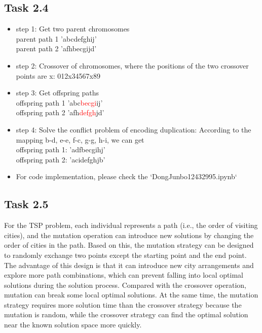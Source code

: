 \documentclass[onecolumn,oneside]{SUSTechHomework}
\begin{document}
    \subsection*{Task 2.4}
    \begin{itemize}
        \item step 1: Get two parent chromosomes \\
        parent path 1 'abcdefghij' \\
        parent path 2 'afhbecgijd'
        \item step 2: Crossover of chromosomes, where the positions of the two crossover points are x: 012x34567x89
        \item step 3: Get offspring paths \\
        offspring path 1 'abc\textcolor{red}{becgi}ij' \\
        offspring path 2 'afh\textcolor{red}{defgh}jd'
        \item step 4: Solve the conflict problem of encoding duplication: According to the mapping b-d, e-e, f-c, g-g, h-i, we can get \\
        offspring path 1: 'adfbecgihj' \\
        offspring path 2: 'acidefghjb'
        \item For code implementation, please check the `DongJunbo12432995.ipynb`
    \end{itemize}

    \subsection*{Task 2.5}
    For the TSP problem, each individual represents a path (i.e., the order of visiting cities), and the mutation operation can introduce new solutions by changing the order of cities in the path. Based on this, the mutation strategy can be designed to randomly exchange two points except the starting point and the end point. The advantage of this design is that it can introduce new city arrangements and explore more path combinations, which can prevent falling into local optimal solutions during the solution process. Compared with the crossover operation, mutation can break some local optimal solutions. At the same time, the mutation strategy requires more solution time than the crossover strategy because the mutation is random, while the crossover strategy can find the optimal solution near the known solution space more quickly.
\end{document}
